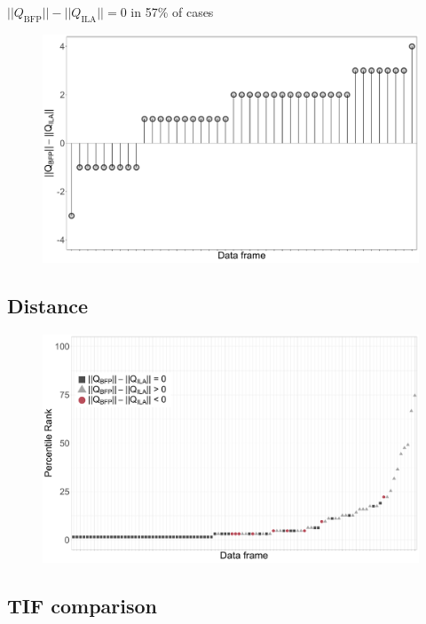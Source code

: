\documentclass[aspectratio=149, compress]{beamer}
\begin{document}
\begin{frame}
	$||Q_{\text{BFP}}|| - ||Q_{\text{ILA}}|| = 0$ in 57\% of cases %
	\begin{figure}
		\centering
		\includegraphics[width=.80\linewidth]{img/bfp-ila}
	\end{figure}
\end{frame}

\subsection*{Distance}

\begin{frame}
	\begin{figure}
		\centering
		\includegraphics[width=.9\linewidth]{img/rp}
	\end{figure}
\end{frame}

\subsection*{TIF comparison}
\end{document}

